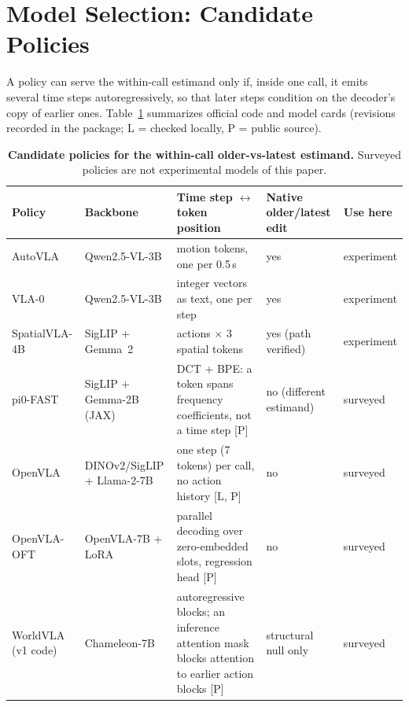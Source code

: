 \section{Model Selection: Candidate Policies}
\label{sec:models}
A policy can serve the within-call estimand only if, inside one call, it emits several time steps autoregressively, so that later steps condition on the decoder's copy of earlier ones. Table~\ref{tab:models} summarizes official code and model cards (revisions recorded in the package; L = checked locally, P = public source).

\begin{table}[h]
\centering\footnotesize
\caption{\textbf{Candidate policies for the within-call older-vs-latest estimand.} Surveyed policies are not experimental models of this paper.}
\label{tab:models}
\begin{tabularx}{\textwidth}{@{}l >{\raggedright\arraybackslash}p{2.5cm} >{\raggedright\arraybackslash}X >{\raggedright\arraybackslash}p{3.0cm} l@{}}\toprule
Policy & Backbone & Time step $\leftrightarrow$ token position & Native older/latest edit & Use here\\\midrule
AutoVLA & Qwen2.5-VL-3B & 10 motion tokens, one per 0.5\,s & yes & experiment\\
VLA-0 & Qwen2.5-VL-3B & 8 integer vectors as text, one per step & yes & experiment\\
SpatialVLA-4B & SigLIP + Gemma~2 & 4 actions $\times$ 3 spatial tokens & yes (path verified) & experiment\\
pi0-FAST & SigLIP + Gemma-2B (JAX) & DCT + BPE: a token spans frequency coefficients, not a time step [P] & no (different estimand) & surveyed\\
OpenVLA & DINOv2/SigLIP + Llama-2-7B & one step (7 tokens) per call, no action history [L, P] & no & surveyed\\
OpenVLA-OFT & OpenVLA-7B + LoRA & parallel decoding over zero-embedded slots, regression head [P] & no & surveyed\\
WorldVLA (v1 code) & Chameleon-7B & autoregressive blocks; an inference attention mask blocks attention to earlier action blocks [P] & structural null only & surveyed\\\bottomrule
\end{tabularx}
\end{table}


